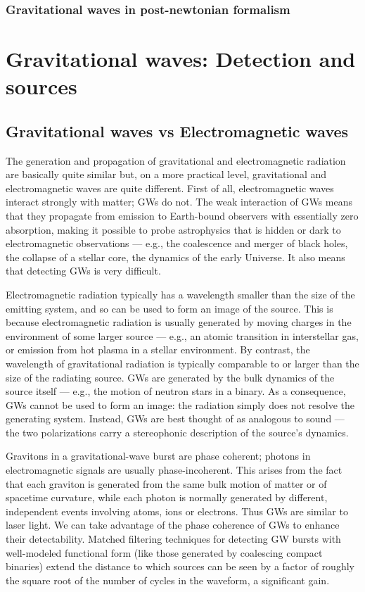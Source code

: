 \documentclass[binding=0.6cm, LaM]{sapthesis}
\begin{document}
\subsection{Gravitational waves in post-newtonian formalism}

\chapter{Gravitational waves: Detection and sources}
\section{Gravitational waves vs Electromagnetic waves}
The generation and propagation of gravitational and electromagnetic radiation are basically quite similar but, on a more practical level, gravitational and electromagnetic waves are quite different.
First of all, electromagnetic waves interact strongly with matter; GWs do not. 
The weak interaction of GWs means that they propagate from emission to Earth-bound observers with essentially zero absorption, making it possible to probe astrophysics that is hidden or dark to 
electromagnetic observations — e.g., the coalescence and merger of black holes, the collapse of a stellar core, the dynamics of the early Universe. It also means that detecting GWs is very difficult. 

Electromagnetic radiation typically has a wavelength smaller than the size of the emitting system, and so can be used to form an image of the source.
 This is because electromagnetic radiation is usually generated by moving charges in the environment of some larger source — e.g., an atomic transition in interstellar gas, or emission from hot plasma
 in a stellar environment. By contrast, the wavelength of gravitational radiation is typically comparable to or larger than the size of the radiating source. 
GWs are generated by the bulk dynamics of the source itself — e.g., the motion of neutron stars in a binary. As a consequence, GWs cannot be used to form an image: the radiation simply does not 
resolve the generating system. Instead, GWs are best thought of as analogous to sound — the two polarizations carry a stereophonic description of the source’s dynamics.

Gravitons in a gravitational-wave burst are phase coherent; photons in electromagnetic signals are usually phase-incoherent. This arises from the fact that each graviton is generated from the same 
bulk motion of matter or of spacetime curvature, while each photon is normally generated by different, independent events involving atoms, ions or electrons. 
Thus GWs are similar to laser light. We can take advantage of the phase coherence of GWs to enhance their detectability. Matched filtering techniques for detecting GW bursts with well-modeled 
functional form (like those generated by coalescing compact binaries) extend the distance to which sources can be seen by a factor of roughly the square root of the number of cycles in the waveform, 
a significant gain.
\end{document}
